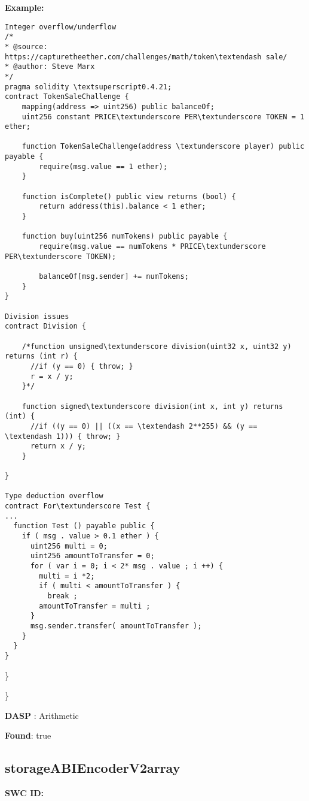 \documentclass{article}
\begin{document}
\textbf{Example:} 
\begin{verbatim}
Integer overflow/underflow
/*
* @source: https://capturetheether.com/challenges/math/token\textendash sale/
* @author: Steve Marx
*/
pragma solidity \textsuperscript0.4.21;
contract TokenSaleChallenge {
    mapping(address => uint256) public balanceOf;
    uint256 constant PRICE\textunderscore PER\textunderscore TOKEN = 1 ether;

    function TokenSaleChallenge(address \textunderscore player) public payable {
        require(msg.value == 1 ether);
    }

    function isComplete() public view returns (bool) {
        return address(this).balance < 1 ether;
    }

    function buy(uint256 numTokens) public payable {
        require(msg.value == numTokens * PRICE\textunderscore PER\textunderscore TOKEN);

        balanceOf[msg.sender] += numTokens;
    }
}

Division issues
contract Division {

    /*function unsigned\textunderscore division(uint32 x, uint32 y) returns (int r) {
      //if (y == 0) { throw; }
      r = x / y;
    }*/

    function signed\textunderscore division(int x, int y) returns (int) {
      //if ((y == 0) || ((x == \textendash 2**255) && (y == \textendash 1))) { throw; }
      return x / y;
    }

}

Type deduction overflow
contract For\textunderscore Test {
...
  function Test () payable public {
    if ( msg . value > 0.1 ether ) {
      uint256 multi = 0;
      uint256 amountToTransfer = 0;
      for ( var i = 0; i < 2* msg . value ; i ++) {
        multi = i *2;
        if ( multi < amountToTransfer ) {
          break ;
        amountToTransfer = multi ;
      }
      msg.sender.transfer( amountToTransfer );
    }
  }
}

\end{verbatim}\} 

\} 

\textbf{DASP} : Arithmetic

\textbf{Found}: true

\subsection{storage\textunderscore ABIEncoderV2\textunderscore array} 
\textbf{SWC \textunderscore ID:} 
\end{document}
